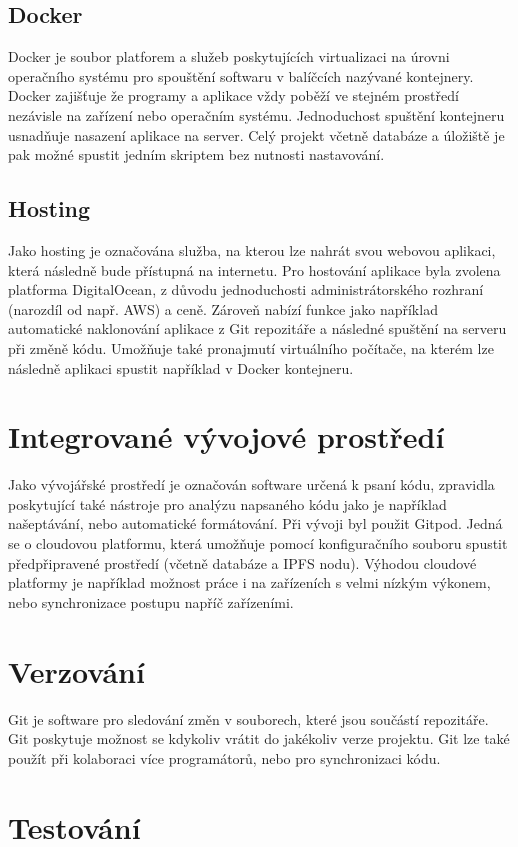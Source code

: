 \documentclass[12pt, a4paper,
 twoside,        %
 openright
]{report}
\begin{document}
\subsection{Docker}
Docker je soubor platforem a služeb poskytujících virtualizaci na úrovni operačního systému pro spouštění softwaru v balíčcích nazývané kontejnery. Docker zajišťuje že programy a aplikace vždy poběží ve stejném prostředí nezávisle na zařízení nebo operačním systému. Jednoduchost spuštění kontejneru usnadňuje nasazení aplikace na server. Celý projekt včetně databáze a úložiště je pak možné spustit jedním skriptem bez nutnosti nastavování.
\subsection{Hosting}
Jako hosting je označována služba, na kterou lze nahrát svou webovou aplikaci, která následně bude přístupná na internetu. Pro hostování aplikace byla zvolena platforma DigitalOcean, z důvodu jednoduchosti administrátorského rozhraní (narozdíl od např. AWS) a ceně. Zároveň nabízí funkce jako například automatické naklonování aplikace z Git repozitáře a následné spuštění na serveru při změně kódu. Umožňuje také pronajmutí virtuálního počítače, na kterém lze následně aplikaci spustit například v Docker kontejneru.
\section{Integrované vývojové prostředí}
Jako vývojářské prostředí je označován software určená k psaní kódu, zpravidla poskytující také nástroje pro analýzu napsaného kódu jako je například našeptávání, nebo automatické formátování. Při vývoji byl použit Gitpod. Jedná se o cloudovou platformu, která umožňuje pomocí konfiguračního souboru spustit předpřipravené prostředí (včetně databáze a IPFS nodu). Výhodou cloudové platformy je například možnost práce i na zařízeních s velmi nízkým výkonem, nebo synchronizace postupu napříč zařízeními. \cite{gitpod}\cite{whatIsIDE}

\section{Verzování}
Git je software pro sledování změn v souborech, které jsou součástí repozitáře. Git poskytuje možnost se kdykoliv vrátit do jakékoliv verze projektu. Git lze také použít při kolaboraci více programátorů, nebo pro synchronizaci kódu.
\section{Testování}
\end{document}
